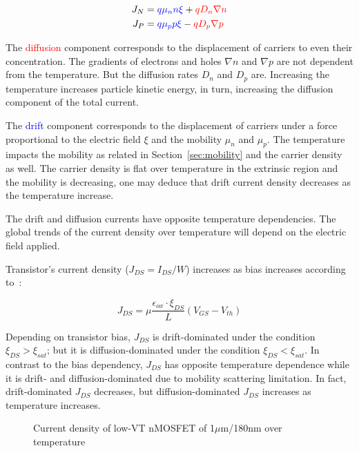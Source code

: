 \begin{align}
\label{eqn:current_density}
J_N &= \textcolor{blue}{q\mu_n n \xi} + \textcolor{red}{qD_n\nabla n} \\
J_P &= \textcolor{blue}{q\mu_p p \xi} - \textcolor{red}{qD_p\nabla p}
\end{align}

The \textcolor{red}{diffusion} component corresponds to the displacement of carriers to even their concentration. The gradients of electrons and holes \(\nabla n \) and \(\nabla p \) are not dependent from the temperature. But the diffusion rates \(D_n \) and \(D_p \) are. Increasing the temperature increases particle kinetic energy, in turn, increasing the diffusion component of the total current.

The \textcolor{blue}{drift} component corresponds to the displacement of carriers under a force proportional to the electric field \(\xi \) and the mobility \(\mu_n \) and \(\mu_p \). The temperature impacts the mobility as related in Section~\ref{sec:mobility} and the carrier density as well. The carrier density is flat over temperature in the extrinsic region and the mobility is decreasing, one may deduce that drift current density decreases as the temperature increase.

The drift and diffusion currents have opposite temperature dependencies. The global trends of the current density over temperature will depend on the electric field applied.

Transistor's current density (\(J_{DS} = I_{DS}/W\)) increases as bias increases according to~\cite{Sze1981}:

\begin{equation}
J_{DS} = \mu \frac{\epsilon_{ox} \cdot \xi_{DS}}{L} \left(V_{GS}-V_{th}\right)
\label{eqn:JDS}
\end{equation}

Depending on transistor bias, \(J_{DS}\) is drift-dominated under the condition \(\xi_{DS} > \xi_{sat}\); but it is diffusion-dominated under the condition \(\xi_{DS} < \xi_{sat}\). In contrast to the bias dependency, \(J_{DS}\) has opposite temperature dependence while it is drift- and \allowbreak diffusion-dominated due to mobility scattering limitation. In fact, drift-dominated \(J_{DS}\) decreases, but diffusion-dominated \(J_{DS}\) increases as temperature increases.

\begin{figure}[!ht]
	\centering
	
	\caption{Current density of low-VT nMOSFET of 1\(\mu \)m/180nm over temperature}
	\label{fig:jds_nel}
\end{figure}

